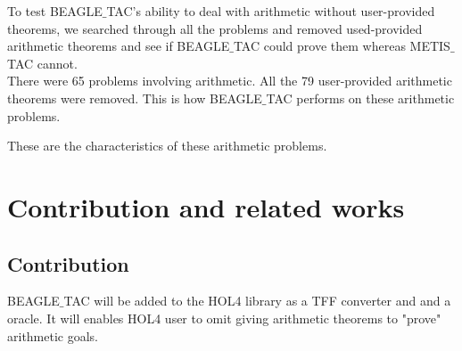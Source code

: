 \documentclass[a4paper, 11pt]{article}
\theoremstyle{plain}
\theoremstyle{definition}
\theoremstyle{remark}
\begin{document}
\noindent To test BEAGLE$\_$TAC's ability to deal with arithmetic without user-provided theorems, we searched through all the problems and removed used-provided arithmetic theorems and see if BEAGLE$\_$TAC could prove them whereas METIS$\_$TAC cannot.
\\There were 65 problems involving arithmetic. All the 79 user-provided arithmetic theorems were removed. This is how BEAGLE$\_$TAC performs on these arithmetic problems.

\begin{center}
\end{center}

These are the characteristics of these arithmetic problems.
\begin{center}
\end{center}

\section{Contribution and related works}

\subsection{Contribution}
BEAGLE$\_$TAC will be added to the HOL4 library as a TFF converter and and a oracle. It will enables HOL4 user to omit giving arithmetic theorems to "prove" arithmetic goals.
\end{document}
